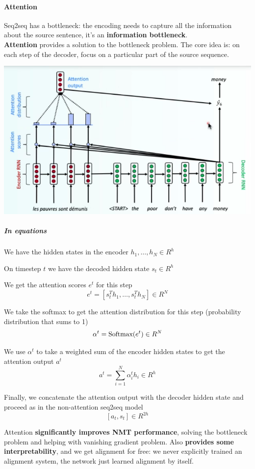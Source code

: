 \documentclass[10pt]{report}
\begin{document}
\paragraph{Attention} Seq2seq has a bottleneck: the encoding needs to capture all the information about the source sentence, it's an \textbf{information bottleneck}.\\
\textbf{Attention} provides a solution to the bottleneck problem. The core idea is: on each step of the decoder, focus on a particular part of the source sequence.
\begin{center}
	\includegraphics[scale=0.6]{67.png}
\end{center}
\subparagraph{In equations}\begin{list}{}{}
	\item We have the hidden states in the encoder $h_1,\ldots,h_N\in R^h$
	\item On timestep $t$ we have the decoded hidden state $s_t \in R^h$
	\item We get the attention scores $e^t$ for this step 
	$$e^t=[s_t^Th_1,\ldots,s_t^Th_N]\in R^N$$
	\item We take the softmax to get the attention distribution for this step (probability distribution that sums to 1)
	$$\alpha^t=\hbox{Softmax}(e^t) \in R^N$$
	\item We use $\alpha^t$ to take a weighted sum of the encoder hidden states to get the attention output $a^t$
	$$a^t = \sum_{i=1}^N \alpha_i^th_i\in R^h$$
	\item Finally, we concatenate the attention output with the decoder hidden state and proceed as in the non-attention seq2seq model
	$$[a_t, s_t]\in R^{2h}$$
\end{list}
Attention \textbf{significantly improves NMT performance}, solving the bottleneck problem and helping with vanishing gradient problem. Also \textbf{provides some interpretability}, and we get alignment for free: we never explicitly trained an alignment system, the network just learned alignment by itself.
\end{document}
